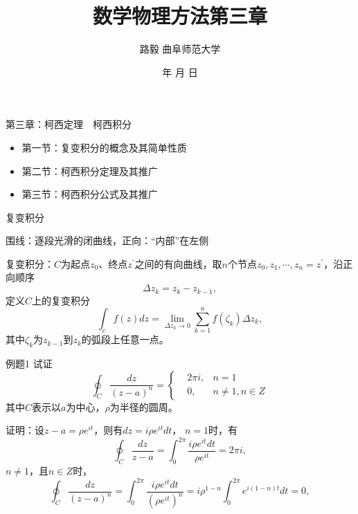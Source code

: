 \documentclass[11pt]{beamer}
\newcommand{\kong}[1][0.5]{\vspace{#1cm}}
\begin{document}
	\author{ 路毅 \hspace{0.3cm} 曲阜师范大学 }
	\date{\number\year 年 \number\month 月 \number\day 日}
	\title{数学物理方法第三章}

\begin{frame}
	\maketitle
\end{frame}

\kaishu

\begin{frame}{第三章：柯西定理　柯西积分}
\begin{itemize}
	\item 第一节：复变积分的概念及其简单性质
	\vspace{1cm}
	\item 第二节：柯西积分定理及其推广
	\vspace{1cm}
	\item 第三节：柯西积分公式及其推广
\end{itemize}
\end{frame}

\begin{frame}{复变积分}

围线：逐段光滑的闭曲线，正向：“内部”在左侧

\kong[0.5]
复变积分：$C$为起点$z_0$、终点$z^\prime$之间的有向曲线，取$n$个节点$z_0, z_1, \cdots, z_n=z^\prime$，沿正向顺序
\begin{equation}
\Delta z_k = z_k - z_{k-1},
\end{equation}
定义$C$上的复变积分
\begin{equation}
\int_c f(z) dz = \lim_{\Delta z_k \rightarrow 0} \sum^n_{k=1} f(\zeta_k) \Delta z_k,
\end{equation}
其中$\zeta_k$为$z_{k-1}$到$z_k$的弧段上任意一点。
\end{frame}

\begin{frame}{例题1}
试证
\begin{equation}
\oint_C \frac{dz}{(z-a)^n} = \left\{
\begin{aligned}
& 2 \pi i, & n=1 \\
& 0, & n\neq 1, n\in Z
\end{aligned}
\right.
\end{equation}
其中$C$表示以$a$为中心，$\rho$为半径的圆周。

\kong[0.5]
证明：设$z-a=\rho e^{it}$，则有$dz = i\rho e^{it} dt$，
$n=1$时，有
\begin{equation}
\oint_C \frac{dz}{z-a} = \int^{2\pi}_0 \frac{ i\rho e^{it} dt}{\rho e^{it}} = 2\pi i,
\end{equation}
$n\neq 1$，且$n\in Z$时，
\begin{equation}
\oint_C \frac{dz}{(z-a)^n} = \int^{2\pi}_0 \frac{ i\rho e^{it} dt}{(\rho e^{it})^n} = i \rho^{1-n} \int^{2\pi}_0 e^{i(1-n)t}dt = 0,
\end{equation}
\end{frame}
\end{document}
